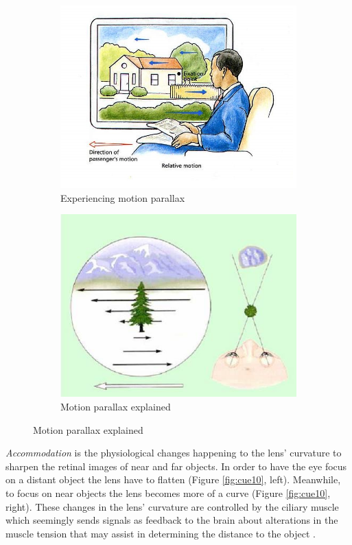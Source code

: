 \begin{figure}
	\centering
	\begin{subfigure}[h!]{0.4\textwidth}
		\includegraphics[width=\textwidth]{figures/cue8.jpg}
		\caption{Experiencing motion parallax \cite{Parallax0}}\label{fig:cue8}
	\end{subfigure}
	\begin{subfigure}[h!]{0.4\textwidth}
		\includegraphics[width=\textwidth]{figures/cue9.jpg}
		\caption{Motion parallax explained \cite{Skybrary}}\label{fig:cue9}
	\end{subfigure}
\end{figure}

\textit{Accommodation} is the physiological changes happening to the lens’ curvature to sharpen the retinal images of near and far objects. In order to have the eye focus on a distant object the lens have to flatten (Figure \ref{fig:cue10}, left). Meanwhile, to focus on near objects the lens becomes more of a curve (Figure \ref{fig:cue10}, right). These changes in the lens’ curvature are controlled by the ciliary muscle which seemingly sends signals as feedback to the brain about alterations in the muscle tension that may assist in determining the distance to the object \cite{Gale}.

